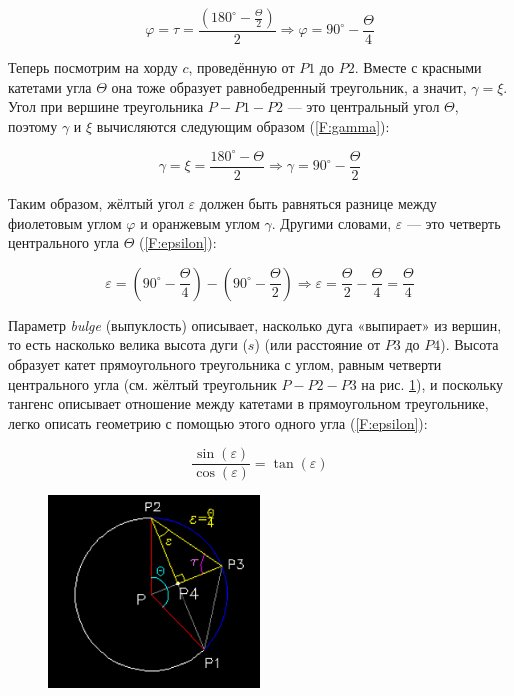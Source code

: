 \begin{equation}
	\varphi=\tau=\frac{(180^{\circ}-\frac{\Theta}{2})}{2}\Rightarrow\varphi=90^{\circ}-\frac{\Theta}{4}
	\label{F:phi}
\end{equation}

Теперь посмотрим на хорду $c$, проведённую от $P1$ до $P2$. Вместе с красными катетами угла $\Theta$ она тоже образует равнобедренный треугольник, а значит, $\gamma=\xi$. Угол при вершине треугольника $P-P1-P2$ --- это центральный угол $\Theta$, поэтому $\gamma$ и $\xi$ вычисляются следующим образом (\ref{F:gamma}):

\begin{equation}
	\gamma=\xi=\frac{180^{\circ}-\Theta}{2}\Rightarrow\gamma=90^{\circ}-\frac{\Theta}{2}
	\label{F:gamma}
\end{equation}

Таким образом, жёлтый угол $\varepsilon$ должен быть равняться разнице между фиолетовым углом $\varphi$ и оранжевым углом $\gamma$. Другими словами, $\varepsilon$ --- это четверть центрального угла $\Theta$ (\ref{F:epsilon}):

\begin{equation}
	\varepsilon=(90^{\circ}-\frac{\Theta}{4})-(90^{\circ}-\frac{\Theta}{2})\Rightarrow\varepsilon=\frac{\Theta}{2}-\frac{\Theta}{4}=\frac{\Theta}{4}
	\label{F:epsilon}
\end{equation}

Параметр \textit{bulge} (выпуклость) описывает, насколько дуга «выпирает» из вершин, то есть насколько велика высота дуги ($s$) (или расстояние от $P3$ до $P4$). Высота образует катет прямоугольного треугольника с углом, равным четверти центрального угла (см. жёлтый треугольник $P-P2-P3$ на рис. \ref{fig:epsilon}), и поскольку тангенс описывает отношение между катетами в прямоугольном треугольнике, легко описать геометрию с помощью этого одного угла (\ref{F:epsilon}):

\begin{equation}
	\frac{\sin(\varepsilon)}{\cos(\varepsilon)}=\tan(\varepsilon)
	\label{F:epsilon}
\end{equation}

\begin{figure}[H]
	\centering
	\includegraphics[width=0.5\textwidth]{figures/epsilon.png}
	\label{fig:epsilon}
\end{figure}

